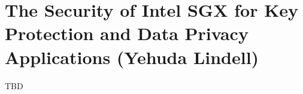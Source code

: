 \section{The Security of Intel SGX for Key Protection and Data Privacy
Applications (Yehuda Lindell)}

TBD
